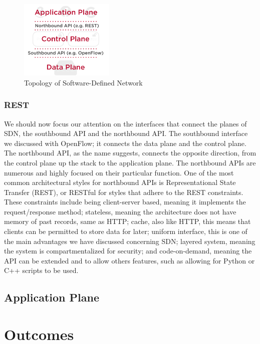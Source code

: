 \documentclass[11pt]{article}
\begin{document}
\begin{figure}
	\centering
	\includegraphics[width=0.4\textwidth]{Topology}
	\caption[]{Topology of Software-Defined Network}
\end{figure}

\subsubsection{REST}

We should now focus our attention on the interfaces that connect the planes of SDN,  the southbound API and the northbound API. The southbound interface we discussed with OpenFlow; it connects the data plane and the control plane. The northbound API, as the name suggests, connects the opposite direction, from the control plane up the stack to the application plane. The northbound APIs are numerous and highly focused on their particular function. One of the most common architectural styles for northbound APIs is Representational State Transfer (REST), or RESTful for styles that adhere to the REST constraints. These constraints include being client-server based, meaning it implements the request/response method; stateless, meaning the architecture does not have memory of past records, same as HTTP; cache, also like HTTP, this means that clients can be permitted to store data for later; uniform interface, this is one of the main advantages we have discussed concerning SDN; layered system, meaning the system is compartmentalized for security; and code-on-demand, meaning the API can be extended and to allow others features, such as allowing for Python or C++ scripts to be used.

\subsection{Application Plane}



\section{Outcomes}
\end{document}
